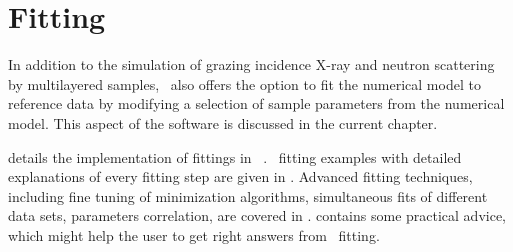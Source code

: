 

\newpage
\chapter{Fitting} 

In addition to the simulation of grazing incidence
X-ray and neutron scattering by
multilayered samples, \BornAgain\ also offers the option to
fit the numerical model to reference data by modifying a selection of
sample parameters from the numerical model.  This aspect
of the software is discussed in the current chapter.

 details the
implementation of fittings in \BornAgain\ . 
\Python\ fitting examples with detailed
explanations of every fitting step are given in . Advanced fitting techniques, including fine tuning of minimization
algorithms, simultaneous fits of different data sets, parameters
correlation, are covered in
.  contains some practical advice, which might
help the user to get right answers from \BornAgain\ fitting.

%











